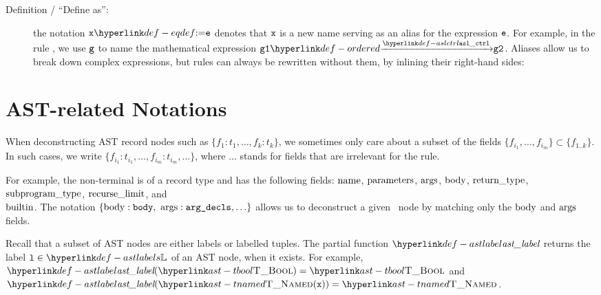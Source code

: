 \begin{description}
\hypertarget{def-eqdef}{}
\item[Definition / ``Define as'':] the notation $\vx \eqdef \ve$ denotes that $\vx$ is a new name serving as an alias for the expression $\ve$.
For example, in the rule , we use $\vg$ to name the mathematical expression
$\ordered{\vgone}{\aslctrl}{\vgtwo}$.
Aliases allow us to break down complex expressions, but rules can always be rewritten without them,
by inlining their right-hand sides:
\begin{mathpar}
\end{mathpar}
\end{description}

\section{AST-related Notations\label{sec:ASTNotations}}

When deconstructing AST record nodes such as $\{f_1:t_1,\ldots,f_k:t_k\}$,
we sometimes only care about a subset of the fields $\{f_{i_1},\ldots,f_{i_m}\} \subset \{f_{1..k}\}$.
In such cases, we write $\{f_{i_1}:t_{i_1},\ldots,f_{i_m}:t_{i_m},\ldots\}$,
where $\ldots$ stands for fields that are irrelevant for the rule.

For example, the \func{} non-terminal is
of a record type and has the following fields:
$\funcname$, $\funcparameters$, $\funcargs$, $\funcbody$, $\funcreturntype$, $\funcsubprogramtype$,
$\funcrecurselimit$, and \\
$\funcbuiltin$.
The notation $\{ \funcbody:\vbody,\ \funcargs:\vargdecls, \ldots \}$
allows us to deconstruct a given \func\ node by matching only the $\funcbody$ and $\funcargs$ fields.

Recall that a subset of AST nodes are either labels or labelled tuples.
\hypertarget{def-astlabel}{}
The partial function $\astlabel$ returns the label $\vl\in\astlabels$ of an AST node, when it exists.
For example, $\astlabel(\TBool) = \TBool$ and $\astlabel(\TNamed(\vx)) = \TNamed$.

